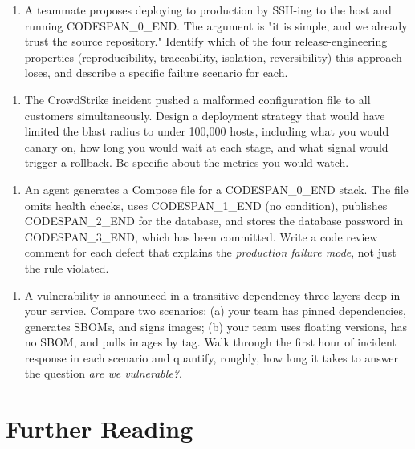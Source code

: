 \documentclass[11pt,a4paper]{book}
\begin{document}
\begin{enumerate}
  \item A teammate proposes deploying to production by SSH-ing to the host and running CODESPAN\_0\_END. The argument is "it is simple, and we already trust the source repository." Identify which of the four release-engineering properties (reproducibility, traceability, isolation, reversibility) this approach loses, and describe a specific failure scenario for each.
\end{enumerate}

\begin{enumerate}
  \item The CrowdStrike incident pushed a malformed configuration file to all customers simultaneously. Design a deployment strategy that would have limited the blast radius to under 100,000 hosts, including what you would canary on, how long you would wait at each stage, and what signal would trigger a rollback. Be specific about the metrics you would watch.
\end{enumerate}

\begin{enumerate}
  \item An agent generates a Compose file for a CODESPAN\_0\_END stack. The file omits health checks, uses CODESPAN\_1\_END (no condition), publishes CODESPAN\_2\_END for the database, and stores the database password in CODESPAN\_3\_END, which has been committed. Write a code review comment for each defect that explains the \textit{production failure mode}, not just the rule violated.
\end{enumerate}

\begin{enumerate}
  \item A vulnerability is announced in a transitive dependency three layers deep in your service. Compare two scenarios: (a) your team has pinned dependencies, generates SBOMs, and signs images; (b) your team uses floating versions, has no SBOM, and pulls images by tag. Walk through the first hour of incident response in each scenario and quantify, roughly, how long it takes to answer the question \textit{are we vulnerable?}.
\end{enumerate}

\medskip

\section{Further Reading}
\end{document}
